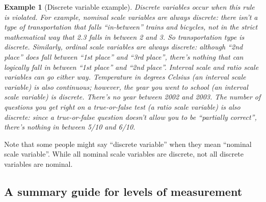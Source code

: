 \documentclass[
  11pt,
]{book}
\theoremstyle{indenteddefinition}
\theoremstyle{indenteddefinition}
\newtheorem{example}{Example}[chapter]
\theoremstyle{definition}
\theoremstyle{definition}
\theoremstyle{remark}
\begin{document}
\begin{example}[Discrete variable example]
\protect\hypertarget{exm:exdiscrete}{}\label{exm:exdiscrete}Discrete variables occur when this rule is violated. For example, nominal scale variables are always discrete: there isn't a type of transportation that falls ``in-between'' trains and bicycles, not in the strict mathematical way that 2.3 falls in between 2 and 3. So transportation type is discrete. Similarly, ordinal scale variables are always discrete: although ``2nd place'' does fall between ``1st place'' and ``3rd place'', there's nothing that can logically fall in between ``1st place'' and ``2nd place''. Interval scale and ratio scale variables can go either way. Temperature in degrees Celsius (an interval scale variable) is also continuous; however, the year you went to school (an interval scale variable) is discrete. There's no year between 2002 and 2003. The number of questions you get right on a true-or-false test (a ratio scale variable) is also discrete: since a true-or-false question doesn't allow you to be ``partially correct'', there's nothing in between 5/10 and 6/10.
\end{example}

Note that some people might say ``discrete variable'' when they mean ``nominal scale variable''. While all nominal scale variables are discrete, not all discrete variables are nominal.

\hypertarget{summaryguidelevels}{%
\subsection{A summary guide for levels of measurement}\label{summaryguidelevels}}
\end{document}
